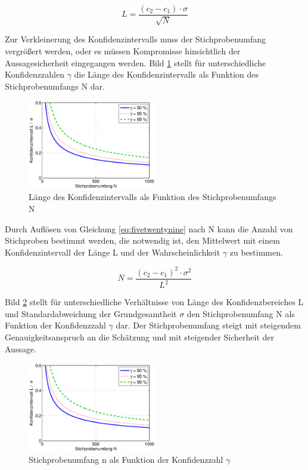\begin{equation}\label{eq:fivetwentynine}
L=\dfrac{\left(c_{2} -c_{1} \right)\cdot \sigma}{\sqrt{N}}
\end{equation}

\noindent Zur Verkleinerung des Konfidenzintervalls muss der Stichprobenumfang vergr\"{o}{\ss}ert werden, oder es m\"{u}ssen Kompromisse hinsichtlich der Aussagesicherheit eingegangen werden. Bild \ref{fig:Konfidenzintervall1} stellt f\"{u}r unterschiedliche Konfidenzzahlen $\gamma$ die L\"{a}nge des Konfidenzintervalls als Funktion des Stichprobenumfangs N dar. 

\noindent 
\begin{figure}[H]
  \centerline{\includegraphics[width=0.5\textwidth]{Kapitel5/Bilder/image6}}
  \caption{L\"{a}nge des Konfidenzintervalls als Funktion des Stichprobenumfangs N}
  \label{fig:Konfidenzintervall1}
\end{figure}

\noindent Durch Aufl\"{o}sen von Gleichung \eqref{eq:fivetwentynine} nach N kann die Anzahl von Stichproben bestimmt werden, die notwendig ist, den Mittelwert mit einem Konfidenzintervall der L\"{a}nge L und der Wahrscheinlichkeit $\gamma$ zu bestimmen. 

\begin{equation}\label{eq:fivethirty}
N=\dfrac{\left(c_{2} -c_{1} \right)^{2} \cdot \sigma ^{2}}{L^{2}}
\end{equation}

\noindent Bild \ref{fig:Konfidenzintervall2} stellt f\"{u}r unterschiedliche Verh\"{a}ltnisse von L\"{a}nge des Konfidenzbereiches L und Standardabweichung der Grundgesamtheit $\sigma$ den Stichprobenumfang N als Funktion der Konfidenzzahl $\gamma$ dar. Der Stichprobenumfang steigt mit steigendem Genauigkeitsanspruch an die Sch\"{a}tzung und mit steigender Sicherheit der Aussage. 

\noindent 
\begin{figure}[H]
  \centerline{\includegraphics[width=0.5\textwidth]{Kapitel5/Bilder/image7}}
  \caption{Stichprobenumfang n als Funktion der Konfidenzzahl $\gamma$}
  \label{fig:Konfidenzintervall2}
\end{figure}

